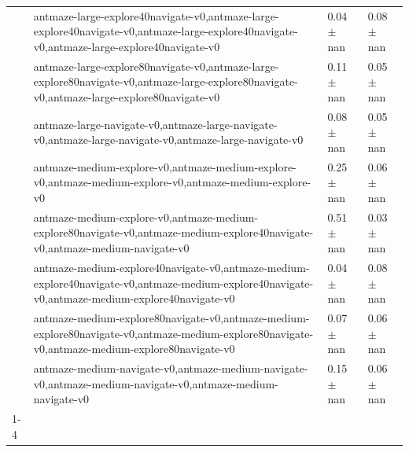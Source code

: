 \begin{tabular}{llll}
 & antmaze-large-explore40navigate-v0,antmaze-large-explore40navigate-v0,antmaze-large-explore40navigate-v0,antmaze-large-explore40navigate-v0 & 0.04 $\pm$ nan & 0.08 $\pm$ nan \\
 & antmaze-large-explore80navigate-v0,antmaze-large-explore80navigate-v0,antmaze-large-explore80navigate-v0,antmaze-large-explore80navigate-v0 & 0.11 $\pm$ nan & 0.05 $\pm$ nan \\
 & antmaze-large-navigate-v0,antmaze-large-navigate-v0,antmaze-large-navigate-v0,antmaze-large-navigate-v0 & 0.08 $\pm$ nan & 0.05 $\pm$ nan \\
 & antmaze-medium-explore-v0,antmaze-medium-explore-v0,antmaze-medium-explore-v0,antmaze-medium-explore-v0 & 0.25 $\pm$ nan & 0.06 $\pm$ nan \\
 & antmaze-medium-explore-v0,antmaze-medium-explore80navigate-v0,antmaze-medium-explore40navigate-v0,antmaze-medium-navigate-v0 & 0.51 $\pm$ nan & 0.03 $\pm$ nan \\
 & antmaze-medium-explore40navigate-v0,antmaze-medium-explore40navigate-v0,antmaze-medium-explore40navigate-v0,antmaze-medium-explore40navigate-v0 & 0.04 $\pm$ nan & 0.08 $\pm$ nan \\
 & antmaze-medium-explore80navigate-v0,antmaze-medium-explore80navigate-v0,antmaze-medium-explore80navigate-v0,antmaze-medium-explore80navigate-v0 & 0.07 $\pm$ nan & 0.06 $\pm$ nan \\
 & antmaze-medium-navigate-v0,antmaze-medium-navigate-v0,antmaze-medium-navigate-v0,antmaze-medium-navigate-v0 & 0.15 $\pm$ nan & 0.06 $\pm$ nan \\
\cline{1-4}
\bottomrule
\end{tabular}
